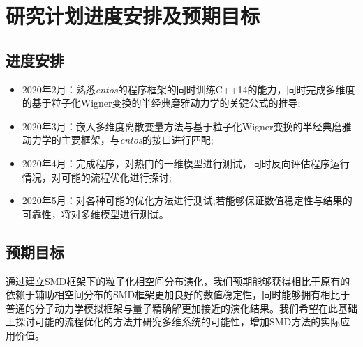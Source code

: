 \section{研究计划进度安排及预期目标}

\subsection{进度安排}
\begin{itemize}
	\item 2020年2月：熟悉\emph{entos}的程序框架的同时训练C++14的能力，同时完成多维度的基于粒子化Wigner变换的半经典磨雅动力学的关键公式的推导;
	\item 2020年3月：嵌入多维度离散变量方法与基于粒子化Wigner变换的半经典磨雅动力学的主要框架，与\emph{entos}的接口进行匹配;
	\item 2020年4月：完成程序，对热门的一维模型进行测试，同时反向评估程序运行情况，对可能的流程优化进行探讨;
	\item 2020年5月：对各种可能的优化方法进行测试;若能够保证数值稳定性与结果的可靠性，将对多维模型进行测试。
\end{itemize}


\subsection{预期目标}
通过建立SMD框架下的粒子化相空间分布演化，我们预期能够获得相比于原有的依赖于辅助相空间分布的SMD框架更加良好的数值稳定性，同时能够拥有相比于普通的分子动力学模拟框架与量子精确解更加接近的演化结果。我们希望在此基础上探讨可能的流程优化的方法并研究多维系统的可能性，增加SMD方法的实际应用价值。